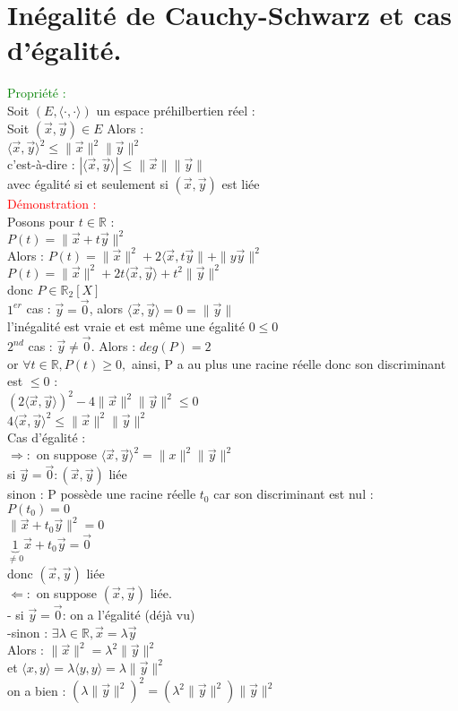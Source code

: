 \documentclass{article}
\begin{document}
\section{Inégalité de Cauchy-Schwarz et cas d'égalité.}
\textcolor{green}{Propriété :} \\
Soit $(E,\langle \cdot , \cdot \rangle)$ un espace préhilbertien réel : \\
Soit $(\vec x, \vec y) \in E$ Alors : \\
$\langle \vec x ,\vec y \rangle^2 \leq  \| \vec x \|^2 \| \vec y \|^2$ \\
c'est-à-dire : $|\langle \vec x ,\vec y \rangle| \leq \| \vec x \| \| \vec y \|$ \\
avec égalité si et seulement si $(\vec x, \vec y)$ est liée \\
\textcolor{red}{Démonstration :} \\
Posons pour $t \in \mathbb R$ : \\
$P(t)= \| \vec x + t \vec y \|^2$ \\
Alors : $P(t)= \| \vec x \|^2 +2 \langle \vec x, t \vec y \| + \| y\vec y \|^2$ \\
$P(t)=\| \vec x \|^2 +2 t \langle \vec x ,\vec y \rangle + t^2 \| \vec y \|^2$ \\
donc $P \in \mathbb R_2 [X]$ \\
$1^{er}$ cas : $\vec y= \vec 0$, alors $\langle \vec x , \vec y \rangle=0= \| \vec y \|$ \\
l'inégalité est vraie et est même une égalité $0 \leq 0$ \\
$2^{nd}$ cas : $\vec y \neq \vec 0$. Alors : $deg(P)=2$ \\
or $\forall t \in \mathbb R, P(t) \geq 0,$ ainsi, P a au plus une racine réelle donc son discriminant est $\leq 0$ : \\
$(2 \langle \vec x , \vec y \rangle)^2-4 \| \vec x \|^2 \| \vec y \|^2 \leq 0$ \\
$4 \langle \vec x ,\vec y \rangle^2 \leq \| \vec x \|^2 \| \vec y \|^2$ \\
Cas d'égalité : \\
$\Rightarrow :$ on suppose $\langle \vec x, \vec y \rangle^2= \| x \|^2 \| \vec y \|^2$ \\
si $\vec y= \vec 0 : (\vec x, \vec y)$ liée \\
sinon :  P possède une racine réelle $t_0$ car son discriminant est nul : \\
$P(t_0)=0$ \\
$\|\vec x + t_0 \vec y \|^2=0$ \\
$\underbrace{1}_{\neq 0} \vec x + t_0 \vec y = \vec 0 $  \\
donc $(\vec x, \vec y)$ liée \\
$\Leftarrow :$ on suppose $(\vec x, \vec y)$ liée. \\
- si $\vec y =\vec 0$: on a l'égalité (déjà vu) \\ 
-sinon : $\exists \lambda \in \mathbb R, \vec x= \lambda \vec y$ \\
Alors : $\| \vec x \|^2= \lambda^2 \| \vec y \|^2$ \\
et $\langle x,y \rangle = \lambda \langle y,y \rangle= \lambda \| \vec y \|^2$ \\
on a bien : $( \lambda \| \vec y \|^2)^2=(\lambda^2 \| \vec y \|^2) \| \vec y \|^2$
\end{document}
